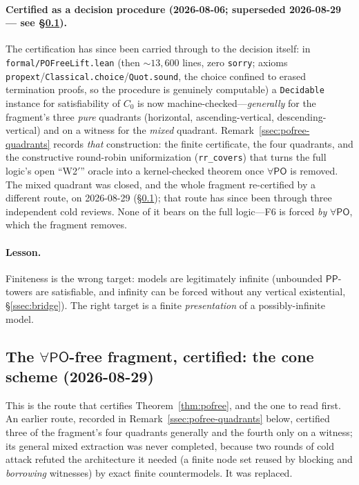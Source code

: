 \documentclass[11pt]{article}
\newcommand{\PO}{\mathsf{PO}}
\newcommand{\PP}{\mathsf{PP}}
\newcommand{\code}[1]{\texttt{#1}}
\theoremstyle{plain}
\theoremstyle{definition}
\begin{document}
\paragraph{Certified as a decision procedure (2026-08-06; superseded
2026-08-29 --- see \S\ref{ssec:conescheme}).} The certification
has since been carried through to the decision itself: in
\texttt{formal/POFreeLift.lean} (then ${\sim}13{,}600$ lines, zero \code{sorry};
axioms \texttt{propext}/\texttt{Classical.choice}/\texttt{Quot.sound}, the
choice confined to erased termination proofs, so the procedure is genuinely
computable) a \code{Decidable} instance for satisfiability of $C_0$ is now
machine-checked---\emph{generally} for the fragment's three \emph{pure}
quadrants (horizontal, ascending-vertical, descending-vertical) and on a
witness for the \emph{mixed} quadrant.
Remark~\ref{ssec:pofree-quadrants} records \emph{that} construction: the
finite certificate, the four quadrants, and the constructive round-robin
uniformization (\code{rr\_covers}) that turns the full logic's open
``W2$'$'' oracle into a kernel-checked theorem once $\forall\PO$ is removed.
The mixed quadrant was closed, and the whole fragment re-certified by a
different route, on 2026-08-29 (\S\ref{ssec:conescheme}); that route has
since been through three independent cold reviews. None of it bears on the
full logic---F6 is forced \emph{by} $\forall\PO$, which the fragment removes.

\paragraph{Lesson.} Finiteness is the wrong target: models are
legitimately infinite (unbounded $\PP$-towers are satisfiable, and infinity
can be forced without any vertical existential, \S\ref{ssec:bridge}). The right
target is a finite \emph{presentation} of a possibly-infinite model.

\subsection{The $\forall\PO$-free fragment, certified: the cone scheme
(2026-08-29)}
\label{ssec:conescheme}

This is the route that certifies Theorem~\ref{thm:pofree}, and the one to read
first. An earlier route, recorded in Remark~\ref{ssec:pofree-quadrants} below,
certified three of the fragment's four quadrants generally and the fourth only
on a witness; its general mixed extraction was never completed, because two
rounds of cold attack refuted the architecture it needed (a finite node set
reused by blocking and \emph{borrowing} witnesses) by exact finite
countermodels. It was replaced.
\end{document}
